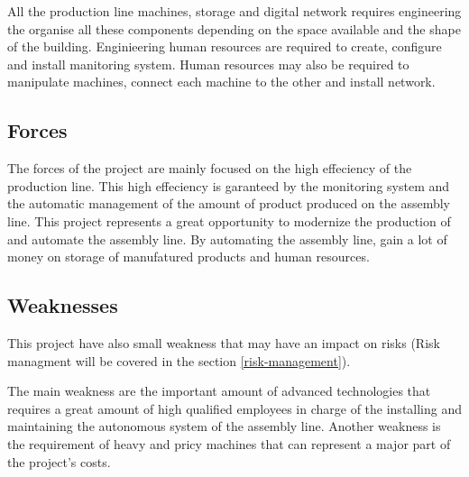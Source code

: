 All the production line machines, storage and digital network requires engineering the organise all these components depending on the space available and the shape of the building.
Enginieering human resources are required to create, configure and install manitoring system.
Human resources may also be required to manipulate machines, connect each machine to the other and install network.

\subsection{Forces}

The forces of the project are mainly focused on the high effeciency of the production line.
This high effeciency is garanteed by the monitoring system and the automatic management of the amount of product produced on the assembly line.
This project represents a great opportunity to modernize the production of \moldco and automate the assembly line.
By automating the assembly line, \moldco gain a lot of money on storage of manufatured products and human resources.

\subsection{Weaknesses}

This project have also small weakness that may have an impact on risks
(Risk managment will be covered in the section \ref{risk-management}).

The main weakness are the important amount of advanced technologies that requires a great amount of high qualified employees in charge of the installing and maintaining the autonomous system of the assembly line.
Another weakness is the requirement of heavy and pricy machines that can represent a major part of the project's costs.